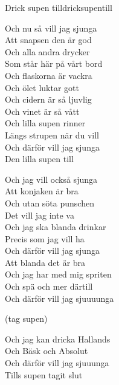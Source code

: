 \begin{song}{Drick supen till}{dricksupentill}
\begin{vers}
Och nu så vill jag sjunga\\
Att snapsen den är god\\
Och alla andra drycker \\
Som står här på vårt bord\\
Och flaskorna är vackra\\
Och ölet luktar gott\\
Och cidern är så ljuvlig\\
Och vinet är så vått\\
Och lilla supen rinner\\
Längs strupen när du vill\\
Och därför vill jag sjunga\\
Den lilla supen till\\
\end{vers}
\begin{vers}
Och jag vill också sjunga\\
Att konjaken är bra\\
Och utan söta punschen\\
Det vill jag inte va\\
Och jag ska blanda drinkar\\
Precis som jag vill ha\\
Och därför vill jag sjunga\\
Att blanda det är bra\\
Och jag har med mig spriten\\
Och spä och mer därtill\\
Och därför vill jag sjuuuunga\\
\end{vers}
\begin{vers}
(tag supen)\\
\end{vers}
\begin{vers}
Och jag kan dricka Hallands\\
Och Bäsk och Absolut\\
Och därför vill jag sjuuunga\\
Tills supen tagit slut\\
\end{vers}
\end{song}
